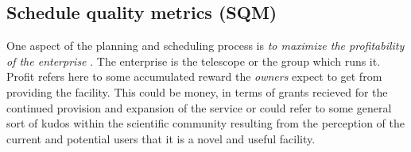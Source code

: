 
\subsection{Schedule quality metrics (SQM)}
\label{sect:sqms}
One aspect of the planning and scheduling process is \emph{to maximize the profitability of the enterprise} \citep{miyashita96distributed}. The enterprise is the telescope or the group which runs it. Profit refers here to some accumulated reward the \emph{owners} expect to get from providing the facility. This could be money, in terms of grants recieved for the continued provision and expansion of the service or could refer to some general sort of kudos within the scientific community resulting from the perception of the current and potential users that it is a novel and useful facility.




